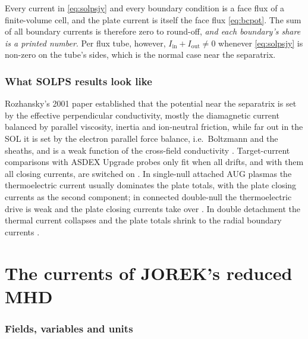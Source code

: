 \documentclass[11pt,a4paper]{article}
\begin{document}
\begin{tcolorbox}[key={Key: why SOLPS budgets always close}]
Every current in \eqref{eq:solpsjy} and every boundary condition is a face flux of a finite-volume cell, and the plate
current is itself the face flux \eqref{eq:bcpot}. The sum of all boundary currents is therefore zero to round-off,
\emph{and each boundary's share is a printed number}. Per flux tube, however, $I_{\mathrm{in}} + I_{\mathrm{out}} \neq 0$
whenever \eqref{eq:solpsjy} is non-zero on the tube's sides, which is the normal case near the separatrix.
\end{tcolorbox}

\section{What SOLPS results look like}

Rozhansky's 2001 paper established that the potential near the separatrix is set by the effective perpendicular
conductivity, mostly the diamagnetic current balanced by parallel viscosity, inertia and ion-neutral friction, while
far out in the SOL it is set by the electron parallel force balance, i.e.\ Boltzmann and the sheaths, and is a weak
function of the cross-field conductivity \cite{rozhansky2001}. Target-current comparisons with ASDEX Upgrade probes
only fit when all drifts, and with them all closing currents, are switched on \cite{coster}. In single-null attached
AUG plasmas the thermoelectric current usually dominates the plate totals, with the plate closing currents as the
second component; in connected double-null the thermoelectric drive is weak and the plate closing currents take over
\cite{rozhansky2020}. In double detachment the thermal current collapses and the plate totals shrink to the radial
boundary currents \cite{senichenkov}.

\part{The currents of JOREK's reduced MHD}

\section{Fields, variables and units}
\end{document}
